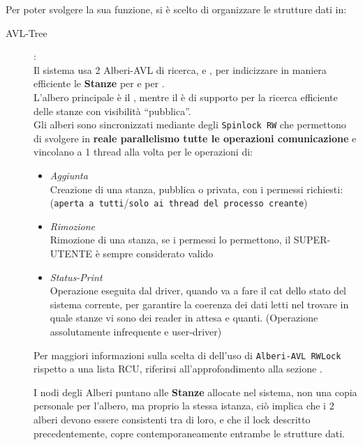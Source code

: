 Per poter svolgere la sua funzione, si è scelto di organizzare le strutture dati in:
\begin{description}
\item[AVL-Tree]:\\
    Il sistema usa 2 Alberi-AVL di ricerca, \tagTree e \keyTree, per indicizzare in maniera efficiente le
    \textbf{Stanze} per \tagSys e per \keySys. \\
    L'albero principale è il \tagTree, mentre il \keyTree è di supporto per la ricerca efficiente delle
    stanze con visibilità ``pubblica''.\\
    Gli alberi sono sincronizzati mediante degli \texttt{Spinlock RW} che permettono di svolgere in \textbf{reale
    parallelismo tutte le operazioni comunicazione} e vincolano a 1 thread alla volta per le operazioni di:
    \begin{itemize}
    \item \textit{Aggiunta} \\
        Creazione di una stanza, pubblica o privata, con i permessi richiesti:\\
        (\texttt{aperta a tutti}/\texttt{solo ai thread del processo creante})
    \item \textit{Rimozione} \\
        Rimozione di una stanza, se i permessi lo permettono, il SUPER-UTENTE è sempre considerato valido
    \item \textit{Status-Print} \\
        Operazione eseguita dal driver, quando va a fare il cat dello stato del sistema corrente, per garantire la
        coerenza dei dati letti nel trovare in quale stanze vi sono dei reader in attesa e quanti. (Operazione
        assolutamente infrequente e user-driver)
\end{itemize}

    \begin{small}
    Per maggiori informazioni sulla scelta di dell'uso di \texttt{Alberi-AVL RWLock} rispetto a una lista
    RCU, riferirsi all'approfondimento alla sezione .
    \end{small}

    I nodi degli Alberi puntano alle \textbf{Stanze} allocate nel sistema, non una copia personale per l'albero, ma
    proprio la stessa istanza, ciò implica che i 2 alberi devono essere consistenti tra di loro, e che il lock
    descritto precedentemente, copre contemporaneamente entrambe le strutture dati.


\end{description}
